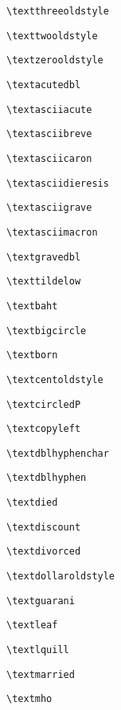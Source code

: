 \documentclass{scrartcl}
\newcommand*\wrapglyph[1]{\fbox{#1}}\fboxsep=0pt
\begin{document}
\wrapglyph{\textthreeoldstyle} \verb+\textthreeoldstyle+\par
\wrapglyph{\texttwooldstyle} \verb+\texttwooldstyle+\par
\wrapglyph{\textzerooldstyle} \verb+\textzerooldstyle+\par
\wrapglyph{\textacutedbl} \verb+\textacutedbl+\par
\wrapglyph{\textasciiacute} \verb+\textasciiacute+\par
\wrapglyph{\textasciibreve} \verb+\textasciibreve+\par
\wrapglyph{\textasciicaron} \verb+\textasciicaron+\par
\wrapglyph{\textasciidieresis} \verb+\textasciidieresis+\par
\wrapglyph{\textasciigrave} \verb+\textasciigrave+\par
\wrapglyph{\textasciimacron} \verb+\textasciimacron+\par
\wrapglyph{\textgravedbl} \verb+\textgravedbl+\par
\wrapglyph{\texttildelow} \verb+\texttildelow+\par
\wrapglyph{\textbaht} \verb+\textbaht+\par
\wrapglyph{\textbigcircle} \verb+\textbigcircle+\par
\wrapglyph{\textborn} \verb+\textborn+\par
\wrapglyph{\textcentoldstyle} \verb+\textcentoldstyle+\par
\wrapglyph{\textcircledP} \verb+\textcircledP+\par
\wrapglyph{\textcopyleft} \verb+\textcopyleft+\par
\wrapglyph{\textdblhyphenchar} \verb+\textdblhyphenchar+\par
\wrapglyph{\textdblhyphen} \verb+\textdblhyphen+\par
\wrapglyph{\textdied} \verb+\textdied+\par
\wrapglyph{\textdiscount} \verb+\textdiscount+\par
\wrapglyph{\textdivorced} \verb+\textdivorced+\par
\wrapglyph{\textdollaroldstyle} \verb+\textdollaroldstyle+\par
\wrapglyph{\textguarani} \verb+\textguarani+\par
\wrapglyph{\textleaf} \verb+\textleaf+\par
\wrapglyph{\textlquill} \verb+\textlquill+\par
\wrapglyph{\textmarried} \verb+\textmarried+\par
\wrapglyph{\textmho} \verb+\textmho+\par
\end{document}
